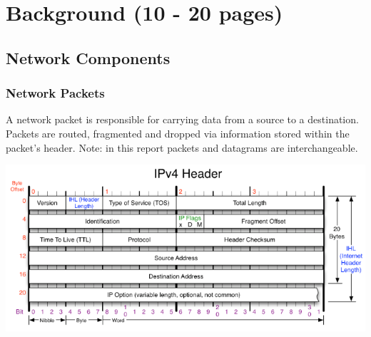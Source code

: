 \documentclass[a4paper, titlepage]{article}
\begin{document}
\newpage

\section{Background (10 - 20 pages)}
\subsection{Network Components}
\subsubsection{Network Packets}
A network packet is responsible for carrying data from a source to a destination. Packets are routed, fragmented and dropped via information stored within the packet's header. Note: in this report packets and datagrams are interchangeable.

\includegraphics[width=\textwidth]{images/ipv4header.png}
\end{document}
